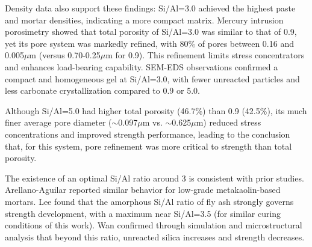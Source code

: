 Density data also support these findings: Si/Al=3.0 achieved the highest paste and mortar densities, indicating a more compact matrix.  
Mercury intrusion porosimetry showed that total porosity of Si/Al=3.0 was similar to that of 0.9, yet its pore system was markedly refined, with 80\% of pores between 0.16 and 0.005$\mu$m (versus 0.70-0.25$\mu$m for 0.9).  
This refinement limits stress concentrators and enhances load-bearing capability.  
SEM-EDS observations confirmed a compact and homogeneous gel at Si/Al=3.0, with fewer unreacted particles and less carbonate crystallization compared to 0.9 or 5.0.





Although Si/Al=5.0 had higher total porosity (46.7\%) than 0.9 (42.5\%), its much finer average pore diameter ($\sim$0.097$\mu$m vs. $\sim$0.625$\mu$m) reduced stress concentrations and improved strength performance, leading to the conclusion that, for this system, pore refinement was more critical to strength than total porosity.  


The existence of an optimal Si/Al ratio around 3 is consistent with prior studies.  
Arellano-Aguilar \cite{arellano2014geopolymer} reported similar behavior for low-grade metakaolin-based mortars.  
Lee \cite{lee2017strength} found that the amorphous Si/Al ratio of fly ash strongly governs strength development, with a maximum near Si/Al=3.5 (for similar curing conditions of this work).  
Wan \cite{wan2017geopolymerization} confirmed through simulation and microstructural analysis that beyond this ratio, unreacted silica increases and strength decreases.  




